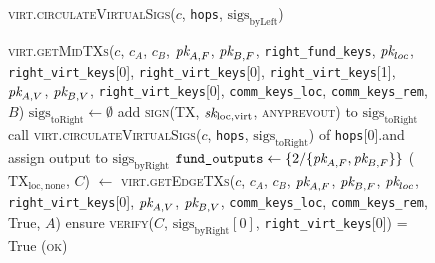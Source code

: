 \begin{figure}[H]
\begin{processbox}{\textsc{virt.circulateVirtualSigs}($c$, \texttt{hops},
  $\mathrm{sigs}_{\mathrm{byLeft}}$)}
\begin{algorithmic}[1]
        \textsc{virt.getMidTXs}($c$, $c_A$, $c_B$, $\textit{pk}_{A, F}$, $\textit{pk}_{B, F}$,
        \texttt{right\_fund\_keys}, $\textit{pk}_{loc}$, \texttt{right\_virt\_keys}[0],
        \texttt{right\_virt\_keys}[0], \texttt{right\_virt\_keys}[1], $\textit{pk}_{A,
        V}$, $\textit{pk}_{B, V}$, \texttt{right\_virt\_keys}[0],
        \texttt{comm\_keys\_loc}, \texttt{comm\_keys\_rem}, $B$)
        \State $\mathrm{sigs}_{\mathrm{toRight}} \gets \emptyset$
          \State add \textsc{sign}(TX, $\textit{sk}_{\mathrm{loc}, \mathrm{virt}}$,
          \textsc{anyprevout}) to $\mathrm{sigs}_{\mathrm{toRight}}$
        \EndFor
        \State call \textsc{virt.circulateVirtualSigs}($c$, \texttt{hops},
        $\mathrm{sigs}_{\mathrm{toRight}}$) of \texttt{hops}[0].\bob and
        assign output to $\mathrm{sigs}_{\mathrm{byRight}}$
        \State $\texttt{fund\_outputs} \gets \{ 2/\{\textit{pk}_{A, F}, \textit{pk}_{B, F}\} \}$
        \State ($\mathrm{TX}_{\mathrm{loc}, \mathrm{none}}$, $C$) $\gets$
        \textsc{virt.getEdgeTXs}($c$, $c_A$, $c_B$, $\textit{pk}_{A, F}$, $\textit{pk}_{B, F}$,
        $\textit{pk}_{loc}$, \texttt{right\_virt\_keys}[0], $\textit{pk}_{A, V}$, $\textit{pk}_{B, V}$,
        \texttt{comm\_keys\_loc}, \texttt{comm\_keys\_rem}, True, $A$)
        \State ensure \textsc{verify}($C$,
        $\mathrm{sigs}_{\mathrm{byRight}}[0]$, \texttt{right\_virt\_keys}[0]) =
        True
        \State \Return (\textsc{ok})
      \EndIf
    \end{algorithmic}
  \end{processbox}
  \caption{}
  \label{code:virtual-layer:virtual-sigs}
\end{figure}

